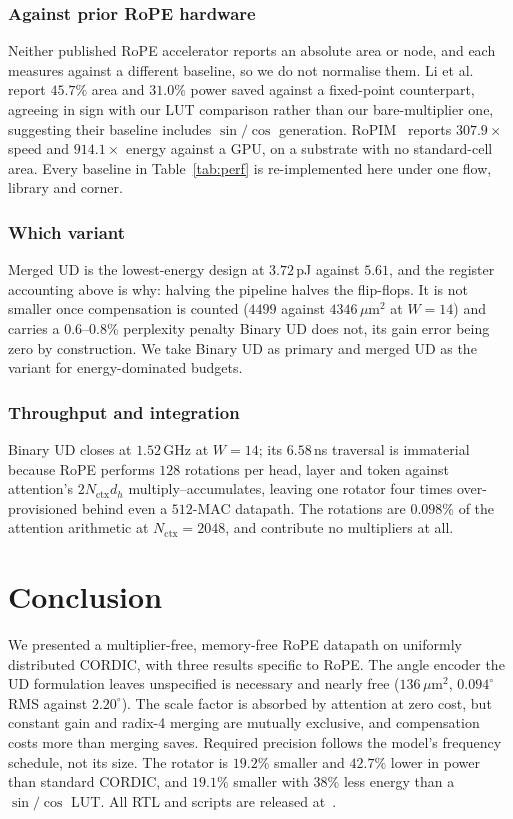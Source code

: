 \documentclass[conference]{IEEEtran}
\begin{document}
\subsubsection{Against prior RoPE hardware}
Neither published RoPE accelerator reports an absolute area or node, and each
measures against a different baseline, so we do not normalise them. Li
et al.~\cite{standard_cordic_rope} report $45.7\%$ area and $31.0\%$ power
saved against a fixed-point counterpart, agreeing in sign with our LUT
comparison rather than our bare-multiplier one, suggesting their baseline
includes $\sin/\cos$ generation. RoPIM~\cite{c23} reports $307.9\times$ speed
and $914.1\times$ energy against a GPU, on a substrate with no standard-cell
area. Every baseline in Table~\ref{tab:perf} is re-implemented here under one
flow, library and corner.

\subsubsection{Which variant}
Merged UD is the lowest-energy design at $3.72$\,pJ against $5.61$, and the
register accounting above is why: halving the pipeline halves the flip-flops.
It is not smaller once compensation is counted ($4499$ against
$4346$\,$\mu$m$^2$ at $W=14$) and carries a $0.6$--$0.8\%$ perplexity penalty
Binary UD does not, its gain error being zero by construction. We take Binary
UD as primary and merged UD as the variant for energy-dominated budgets.

\subsubsection{Throughput and integration}
Binary UD closes at $1.52$\,GHz at $W=14$; its $6.58$\,ns traversal is
immaterial because RoPE performs $128$ rotations per head, layer and token
against attention's $2N_{\text{ctx}}d_h$ multiply--accumulates, leaving one
rotator four times over-provisioned behind even a $512$-MAC datapath. The
rotations are $0.098\%$ of the attention arithmetic at $N_{\text{ctx}}=2048$,
and contribute no multipliers at all.

\section{Conclusion}

We presented a multiplier-free, memory-free RoPE datapath on uniformly
distributed CORDIC, with three results specific to RoPE. The angle encoder the
UD formulation leaves unspecified is necessary and nearly free
($136$\,$\mu$m$^2$, $0.094^{\circ}$ RMS against $2.20^{\circ}$). The scale
factor is absorbed by attention at zero cost, but constant gain and radix-4
merging are mutually exclusive, and compensation costs more than merging
saves. Required precision follows the model's frequency schedule, not its
size. The rotator is $19.2\%$ smaller and $42.7\%$ lower in power than
standard CORDIC, and $19.1\%$ smaller with $38\%$ less energy than a
$\sin/\cos$ LUT. All RTL and scripts are released at~\cite{github}.

\balance


\end{document}
